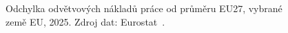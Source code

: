 \def\strEuOdvetvoveMzdyOdchylkaCaption{Odchylka odvětvových nákladů práce od průměru EU27, vybrané země EU, 2025. Zdroj dat: Eurostat~\cite{eurostat_lc_lci_lev_D1D4MD5_PPS_h}.}%
%
\begin{figure}[H]
  \centering
  \resizebox{\linewidth}{!}{}
  \caption{\strEuOdvetvoveMzdyOdchylkaCaption}
  \label{fig:eu_odvetvove_mzdy_odchylka}
\end{figure}
